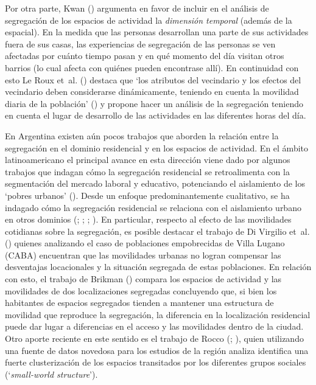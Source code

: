 \documentclass[
  spanish,
  a4paper,%
  chapterprefix=true,%
  DIV=calc,%
  twoside]{scrbook}%
\begin{document}
Por otra parte, Kwan () argumenta en favor de incluir en el análisis
de segregación de los espacios de actividad la \emph{dimensión temporal}
(además de la espacial). En la medida que las personas desarrollan una
parte de sus actividades fuera de sus casas, las experiencias de
segregación de las personas se ven afectadas por cuánto tiempo pasan y
en qué momento del día visitan otros barrios (lo cual afecta con quiénes
pueden encontrase allí). En continuidad con esto
Le Roux et~al. () destaca que `los atributos del vecindario y los efectos del
vecindario deben considerarse dinámicamente, teniendo en cuenta la
movilidad diaria de la población' () y propone hacer
un análisis de la segregación teniendo en cuenta el lugar de desarrollo
de las actividades en las diferentes horas del día.

En Argentina existen aún pocos trabajos que aborden la relación entre la
segregación en el dominio residencial y en los espacios de actividad. En
el ámbito latinoamericano el principal avance en esta dirección viene
dado por algunos trabajos que indagan cómo la segregación residencial se
retroalimenta con la segmentación del mercado laboral y educativo,
potenciando el aislamiento de los `pobres urbanos' (). Desde
un enfoque predominantemente cualitativo, se ha indagado cómo la
segregación residencial se relaciona con el aislamiento urbano en otros
dominios (; ; ; ). En
particular, respecto al efecto de las movilidades cotidianas sobre la
segregación, es posible destacar el trabajo de Di Virgilio et~al. () quienes
analizando el caso de poblaciones empobrecidas de Villa Lugano (CABA)
encuentran que las movilidades urbanas no logran compensar las
desventajas locacionales y la situación segregada de estas poblaciones.
En relación con esto, el trabajo de Brikman () compara los espacios de
actividad y las movilidades de dos localizaciones segregadas concluyendo
que, si bien los habitantes de espacios segregados tienden a mantener
una estructura de movilidad que reproduce la segregación, la diferencia
en la localización residencial puede dar lugar a diferencias en el
acceso y las movilidades dentro de la ciudad. Otro aporte reciente en
este sentido es el trabajo de Rocco (; ), quien
utilizando una fuente de datos novedosa para los estudios de la región
analiza identifica una fuerte clusterización de los espacios transitados
por los diferentes grupos sociales (`\emph{small-world structure}').
\end{document}
